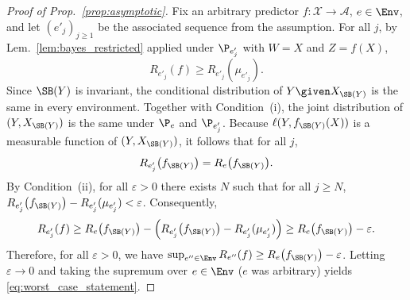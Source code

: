 \begin{proof}[Proof of Prop.~\ref{prop:asymptotic}]
Fix an arbitrary predictor $f \colon \mathcal{X} \to \mathcal{A}$, $e \in \Env$, and let $(e'_j)_{j \geq 1}$ be the associated sequence from the assumption.
For all $j$, by Lem.~\ref{lem:bayes_restricted} applied under $\P_{e'_j}$ with
$W = X$ and $Z = f(X)$,
$$ R_{e'_j}(f) \geq R_{e'_j}(\mu_{e'_j}). $$
Since $\SB(Y)$ is invariant, the conditional distribution of
$Y \given X_{\SB(Y)}$ is the same in every environment. Together
with Condition~(i), the joint distribution of $(Y, X_{\SB(Y)})$ is the
same under $\P_e$ and $\P_{e'_j}$. Because
$\ell(Y, f_{\SB(Y)}(X))$ is a measurable function of
$(Y, X_{\SB(Y)})$, it follows that for all $j$,
$$ R_{e'_j} \bigl(f_{\SB(Y)}\bigr) =
  R_e \bigl(f_{\SB(Y)}\bigr). $$
By Condition~(ii), for all $\varepsilon>0$ there exists $N$ such that for all $j \geq N$, $R_{e'_j}\bigl(f_{\SB(Y)}\bigr)-R_{e'_j}(\mu_{e'_j})< \varepsilon$. Consequently,
\[
  R_{e'_j}(f)
  \geq
  R_e\bigl(f_{\SB(Y)}\bigr)
  -
  \Bigl(
    R_{e'_j}\bigl(f_{\SB(Y)}\bigr)-R_{e'_j}(\mu_{e'_j})
  \Bigr)
  \geq R_e\bigl(f_{\SB(Y)}\bigr) - \varepsilon.
\]
Therefore, for all $\varepsilon>0$, we have $\sup_{e'' \in \Env} R_{e''}(f) \geq R_e\bigl(f_{\SB(Y)}\bigr) - \varepsilon$. Letting $\varepsilon \to 0$ and taking the supremum over $e \in \Env$ ($e$ was arbitrary) yields \eqref{eq:worst_case_statement}.
\end{proof}








